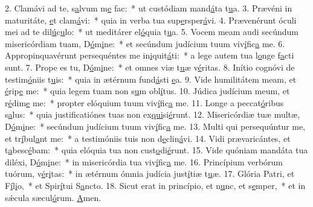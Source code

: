 2. Clamávi ad te, s\uline{a}lvum m\uline{e} fac:~* ut custódiam mand\uline{á}ta t\uline{u}a.
3. Prævéni in maturitáte, \uline{e}t clam\uline{á}vi:~* quia in verba tua sup\uline{e}rsper\uline{á}vi.
4. Prævenérunt óculi mei ad te dil\uline{ú}c\uline{u}lo:~* ut meditárer el\uline{ó}quia t\uline{u}a.
5. Vocem meam audi secúndum misericórdiam tuam, D\uline{ó}m\uline{i}ne:~* et secúndum judícium tuum viv\uline{í}fic\uline{a} me.
6. Appropinquavérunt persequéntes me in\uline{i}quit\uline{á}ti:~* a lege autem tua l\uline{o}nge f\uline{a}cti sunt.
7. Prope es tu, D\uline{ó}m\uline{i}ne:~* et omnes viæ t\uline{u}æ v\uline{é}ritas.
8. Inítio cognóvi de testim\uline{ó}niis t\uline{u}is:~* quia in ætérnum fund\uline{á}sti \uline{e}a.
9. Vide humilitátem meam, et \uline{é}rip\uline{e} me:~* quia legem tuam non s\uline{u}m obl\uline{í}tus.
10. Júdica judícium meum, et r\uline{é}dim\uline{e} me:~* propter elóquium tuum viv\uline{í}fic\uline{a} me.
11. Longe a peccat\uline{ó}ribus s\uline{a}lus:~* quia justificatiónes tuas non ex\uline{qui}si\uline{é}runt.
12. Misericórdiæ tuæ multæ, D\uline{ó}m\uline{i}ne:~* secúndum judícium tuum viv\uline{í}fic\uline{a} me.
13. Multi qui persequúntur me, et tr\uline{í}bul\uline{a}nt me:~* a testimóniis tuis non d\uline{e}clin\uline{á}vi.
14. Vidi prævaricántes, et t\uline{a}besc\uline{é}bam:~* quia elóquia tua non cust\uline{o}di\uline{é}runt.
15. Vide quóniam mandáta tua diléxi, D\uline{ó}m\uline{i}ne:~* in misericórdia tua viv\uline{í}fic\uline{a} me.
16. Princípium verbórum tuórum, v\uline{é}r\uline{i}tas:~* in ætérnum ómnia judícia just\uline{í}tiæ t\uline{u}æ.
17. Glória Patri, et F\uline{í}l\uline{i}o,~* et Spir\uline{í}tui S\uline{a}ncto.
18. Sicut erat in princípio, et n\uline{u}nc, et s\uline{e}mper,~* et in sǽcula sæcul\uline{ó}rum. \uline{A}men.
